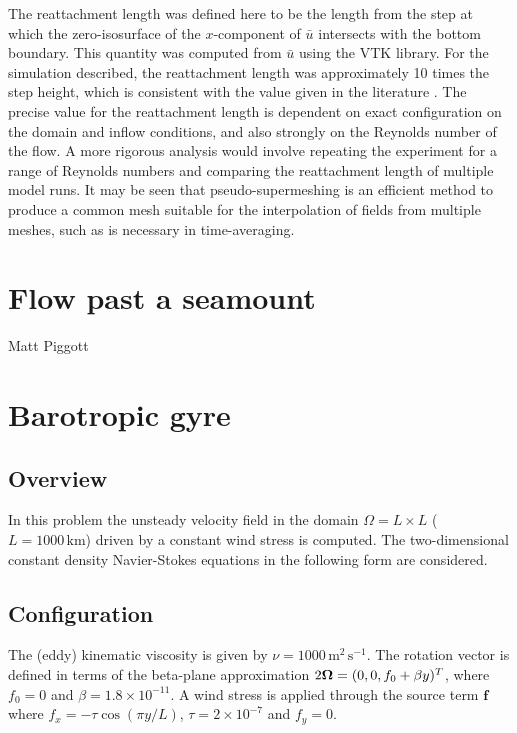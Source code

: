 The reattachment length was defined here to be the length
from the step at which the zero-isosurface of the $x$-component of $\bar{u}$ intersects with
the bottom boundary. This quantity was computed from $\bar{u}$
using the VTK library. For the simulation described, the reattachment
length was approximately 10 times the step height, which is consistent with the value
given in the literature \cite{le1997}.
The precise value for the reattachment length is dependent on exact configuration on the domain and inflow
conditions, and also strongly on the Reynolds number of the flow.
A more rigorous analysis would involve
repeating the experiment for a range of Reynolds numbers and comparing the reattachment
length of multiple model runs. It may be seen that pseudo-supermeshing is an efficient
method to produce a common mesh suitable for the interpolation of fields from multiple
meshes, such as is necessary in time-averaging.



\section{Flow past a seamount}
\label{sect:seamount}

Matt Piggott



\section{Barotropic gyre}
\label{sect:barotropic_gyre}
\subsection{Overview}
In this problem the unsteady velocity field in the domain $\Omega = L\times L$
($L=1000\,\textrm{km}$) driven by a constant
wind stress is computed.
The two-dimensional constant density Navier-Stokes equations in the following form are considered.

\subsection{Configuration}
The (eddy) kinematic viscosity is given by $\nu = 1000\,\textrm{m}^2\,\textrm{s}^{-1}$.
The rotation vector is defined in terms of the beta-plane approximation
$2{\mbox{\boldmath$\Omega$}}=(0,0,f_0 + \beta y)^T$, where $f_0=0$ and $\beta=1.8\times 10^{-11}$.
A wind stress is applied through the source term $\pmb{f}$ where $f_x = -\tau \cos (\pi y/L)$,
$\tau = 2\times 10^{-7}$ and $f_y=0$.


